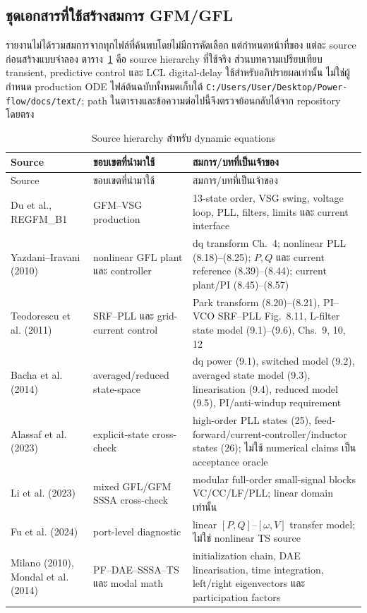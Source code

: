 \documentclass[12pt,a4paper]{article}
\begin{document}
\subsection{ชุดเอกสารที่ใช้สร้างสมการ GFM/GFL}

รายงานไม่ได้รวมสมการจากทุกไฟล์ที่ค้นพบโดยไม่มีการคัดเลือก แต่กำหนดหน้าที่ของ
แต่ละ source ก่อนสร้างแบบจำลอง ตาราง~\ref{tab:model-sources} คือ source hierarchy
ที่ใช้จริง ส่วนบทความเปรียบเทียบ transient, predictive control และ LCL digital-delay
ใช้สำหรับอภิปรายผลเท่านั้น ไม่ใช่ผู้กำหนด production ODE
ไฟล์ต้นฉบับทั้งหมดเก็บใต้
\nolinkurl{C:/Users/User/Desktop/Power-flow/docs/text/};
path ในตารางและข้อความต่อไปนี้จึงตรวจย้อนกลับได้จาก repository โดยตรง

\begin{longtable}{p{}p{}p{}}
\caption{Source hierarchy สำหรับ dynamic equations}\label{tab:model-sources}\\
\toprule
Source & ขอบเขตที่นำมาใช้ & สมการ/บทที่เป็นเจ้าของ \\\midrule
\endfirsthead
\toprule Source & ขอบเขตที่นำมาใช้ & สมการ/บทที่เป็นเจ้าของ \\\midrule
\endhead
Du et al., REGFM\_B1 & GFM--VSG production & 13-state order, VSG swing, voltage loop, PLL, filters, limits และ current interface \\
Yazdani--Iravani (2010) & nonlinear GFL plant และ controller & dq transform Ch.~4; nonlinear PLL (8.18)--(8.25); $P,Q$ และ current reference (8.39)--(8.44); current plant/PI (8.45)--(8.57) \\
Teodorescu et al. (2011) & SRF--PLL และ grid-current control & Park transform (8.20)--(8.21), PI--VCO SRF--PLL Fig.~8.11, L-filter state model (9.1)--(9.6), Chs.~9, 10, 12 \\
Bacha et al. (2014) & averaged/reduced state-space & dq power (9.1), switched model (9.2), averaged state model (9.3), linearisation (9.4), reduced model (9.5), PI/anti-windup requirement \\
Alassaf et al. (2023) & explicit-state cross-check & high-order PLL states (25), feed-forward/current-controller/inductor states (26); ไม่ใช้ numerical claims เป็น acceptance oracle \\
Li et al. (2023) & mixed GFL/GFM SSSA cross-check & modular full-order small-signal blocks VC/CC/LF/PLL; linear domain เท่านั้น \\
Fu et al. (2024) & port-level diagnostic & linear $[P,Q]$--$[\omega,V]$ transfer model; ไม่ใช่ nonlinear TS source \\
Milano (2010), Mondal et al. (2014) & PF--DAE--SSSA--TS และ modal math & initialization chain, DAE linearisation, time integration, left/right eigenvectors และ participation factors \\
\bottomrule
\end{longtable}
\end{document}
